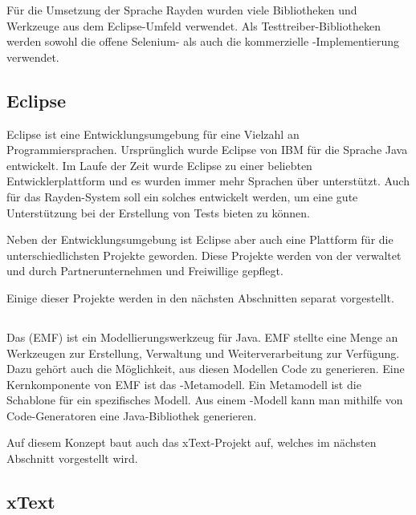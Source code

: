 \SuperPar
Für die Umsetzung der Sprache Rayden wurden viele Bibliotheken und Werkzeuge aus dem Eclipse-Umfeld verwendet. Als Testtreiber-Bibliotheken werden sowohl die offene Selenium- als auch die kommerzielle -Implementierung verwendet.

\subsection{Eclipse}

Eclipse \cite{Eclipse} ist eine Entwicklungsumgebung für eine Vielzahl an Programmiersprachen. Ursprünglich wurde Eclipse von IBM für die Sprache Java entwickelt. Im Laufe der Zeit wurde Eclipse zu einer beliebten Entwicklerplattform und es wurden immer mehr Sprachen über  unterstützt. Auch für das Rayden-System soll ein solches  entwickelt werden, um eine gute Unterstützung bei der Erstellung von Tests bieten zu können. 

\SuperPar
Neben der Entwicklungsumgebung ist Eclipse aber auch eine Plattform für die unterschiedlichsten Projekte geworden. Diese Projekte werden von der  \cite{EclipseFoundation} verwaltet und durch Partnerunternehmen und Freiwillige gepflegt. 

\SuperPar
Einige dieser Projekte werden in den nächsten Abschnitten separat vorgestellt.

\subsection{}

Das  (EMF) \cite{EMF} ist ein Modellierungswerkzeug für Java. EMF stellte eine Menge an Werkzeugen zur Erstellung, Verwaltung und Weiterverarbeitung zur Verfügung. Dazu gehört auch die Möglichkeit, aus diesen Modellen Code zu generieren. Eine Kernkomponente von EMF ist das -Metamodell. Ein Metamodell ist die Schablone für ein spezifisches Modell. Aus einem -Modell kann man mithilfe von Code-Generatoren eine Java-Bibliothek generieren.

\SuperPar
Auf diesem Konzept baut auch das xText-Projekt auf, welches im nächsten Abschnitt vorgestellt wird. 

\subsection{xText}

